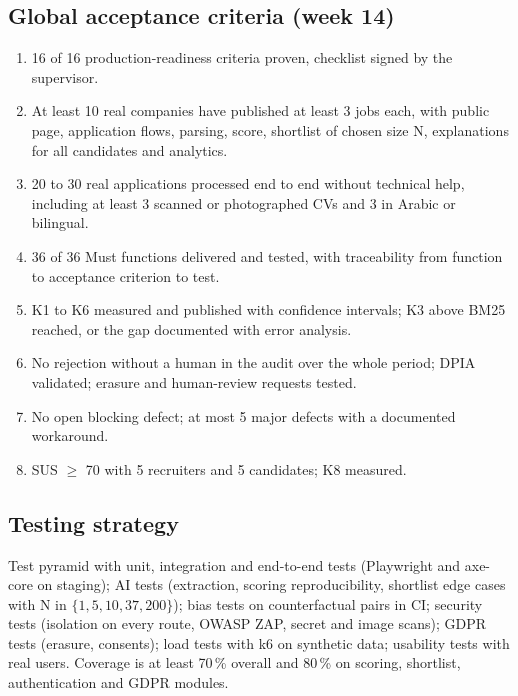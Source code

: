 \documentclass[11pt,a4paper]{article}
\begin{document}
\subsection{Global acceptance criteria (week 14)}
\begin{enumerate}
  \item 16 of 16 production-readiness criteria proven, checklist signed by the supervisor.
  \item At least 10 real companies have published at least 3 jobs each, with public page, application flows, parsing, score, shortlist of chosen size N, explanations for all candidates and analytics.
  \item 20 to 30 real applications processed end to end without technical help, including at least 3 scanned or photographed CVs and 3 in Arabic or bilingual.
  \item 36 of 36 Must functions delivered and tested, with traceability from function to acceptance criterion to test.
  \item K1 to K6 measured and published with confidence intervals; K3 above BM25 reached, or the gap documented with error analysis.
  \item No rejection without a human in the audit over the whole period; DPIA validated; erasure and human-review requests tested.
  \item No open blocking defect; at most 5 major defects with a documented workaround.
  \item SUS $\ge$ 70 with 5 recruiters and 5 candidates; K8 measured.
\end{enumerate}

\subsection{Testing strategy}
Test pyramid with unit, integration and end-to-end tests (Playwright and axe-core on staging); AI tests (extraction, scoring reproducibility, shortlist edge cases with N in $\{1,5,10,37,200\}$); bias tests on counterfactual pairs in CI; security tests (isolation on every route, OWASP ZAP, secret and image scans); GDPR tests (erasure, consents); load tests with k6 on synthetic data; usability tests with real users. Coverage is at least 70\,\% overall and 80\,\% on scoring, shortlist, authentication and GDPR modules.
\end{document}
